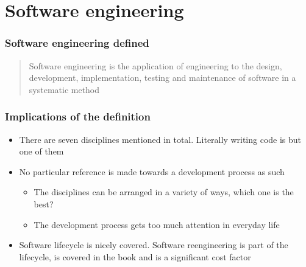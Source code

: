 \section{Software engineering}
\begin{frame}[fragile]
  \frametitle{Software engineering defined}
	\begin{center}
		\begin{quote}
			Software engineering is the application of engineering to the design, development, implementation, testing and maintenance of software in a systematic method
		\end{quote}		
	\end{center}
	\cite{laplante}
\end{frame}

\begin{frame}[fragile]
  \frametitle{Implications of the definition}
	\begin{itemize}
		\item There are seven disciplines mentioned in total. Literally writing code is but one of them
		\item No particular reference is made towards a development process as such
			\begin{itemize}
				\item The disciplines can be arranged in a variety of ways, which one is the best?
				\item The development process gets too much attention in everyday life
			\end{itemize}
		\item Software lifecycle is nicely covered. Software reengineering is part of the lifecycle, is covered in the book and is a significant cost factor
	\end{itemize}
\end{frame}

